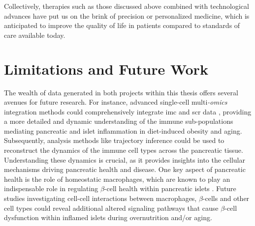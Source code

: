 \par Collectively, therapies such as those discussed above combined with technological advances have put us on the brink of precision or personalized medicine, which is anticipated to improve the quality of life in patients compared to standards of care available today.


\section{Limitations and Future Work}

\par The wealth of data generated in both projects within this thesis offers several avenues for future research. For instance, advanced single-cell multi\textit{-omics} integration methods could comprehensively integrate \gls{imc} and \gls{scr} data \textbf{\cite{repapi_integration_2023}}, providing a more detailed and dynamic understanding of the immune sub-populations mediating pancreatic and islet inflammation in diet-induced obesity and aging. Subsequently, analysis methods like trajectory inference could be used to reconstruct the dynamics of the immune cell types across the pancreatic tissue. Understanding these dynamics is crucial, as it provides insights into the cellular mechanisms driving pancreatic health and disease. One key aspect of pancreatic health is the role of homeostatic macrophages, which are known to play an indispensable role in regulating $\beta$-cell health within pancreatic islets \textbf{\cite{eguchi_islet_2017}}. Future studies investigating cell-cell interactions between macrophages, $\beta$-cells and other cell types could reveal additional altered signaling pathways that cause $\beta$-cell dysfunction within inflamed islets during overnutrition and/or aging.\\



